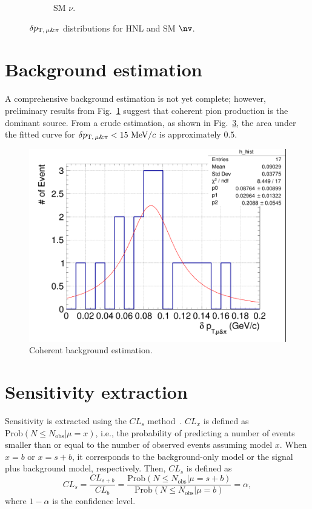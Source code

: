 \begin{figure}[!htb]
\begin{subfigure}{0.45\textwidth}
                \caption{SM $\nu$.}
                \label{fig:sm-mupidpt}
           \end{subfigure}
           \caption{$\delta p_{\textrm{T},\,\mu\&\pi}$ distributions for HNL and SM $\nv$.}
           \label{fig:mmupi-dpt}
        \end{figure}

    
    \section{Background estimation}
        A comprehensive background estimation is not yet complete; however, preliminary results from Fig.~\ref{fig:sm-mupidpt} suggest that coherent pion production is the dominant source. 
        From a crude estimation, as shown in Fig.~\ref{fig:coh-bkg}, the area under the fitted curve for $\delta p_{\textrm{T},\,\mu\&\pi}<15~\textrm{MeV}/c$ is approximately $0.5$. 
        \begin{figure}[!htb] 
            \centering
            \includegraphics[width=0.5\linewidth]{figures/COH.png}
            \caption{Coherent background estimation. }
            \label{fig:coh-bkg}
        \end{figure}    
    
    \section{Sensitivity extraction}
        Sensitivity is extracted using the $CL_s$ method~\cite{Read:2002hq}.
        $CL_x$ is defined as $\textrm{Prob}(N\leq N_{\textrm{obs}}| \mu = x)$, i.e., the probability of predicting a number of events smaller than or equal to the number of observed events assuming model $x$. When $x=b$ or $x=s+b$, it corresponds to the background-only model or the signal plus background model, respectively.
        Then, $CL_s$ is defined as 
        \begin{equation}
            CL_s = \frac{CL_{s+b}}{CL_{b}} = \frac{\textrm{Prob}(N\leq N_{\textrm{obs}}| \mu = s+b)}{\textrm{Prob}(N\leq N_{\textrm{obs}}| \mu = b)} = \alpha,
        \end{equation}
        where $1-\alpha$ is the confidence level.


